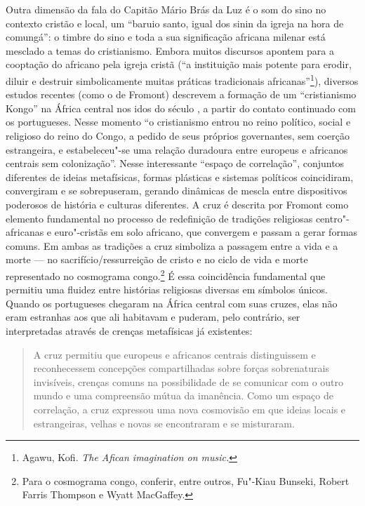 Outra dimensão da fala do Capitão Mário Brás da Luz é o som do sino no
contexto cristão e local, um ``baruio santo, igual dos sinin da igreja
na hora de comungá'': o timbre do sino e toda a sua significação
africana milenar está mesclado a temas do cristianismo. Embora muitos
discursos apontem para a cooptação do africano pela igreja cristã (``a
instituição mais potente para erodir, diluir e destruir simbolicamente
muitas práticas tradicionais africanas''\footnote{Agawu, Kofi. \emph{The
  Afican imagination on music.}}), diversos estudos recentes (como o de
Fromont) descrevem a formação de um ``cristianismo Kongo'' na
África central nos idos do século , a partir do contato continuado com
os portugueses. Nesse momento ``o cristianismo entrou no reino político,
social e religioso do reino do Congo, a pedido de seus próprios
governantes, sem coerção estrangeira, e estabeleceu"-se uma relação
duradoura entre europeus e africanos centrais sem colonização''. Nesse
interessante ``espaço de correlação'', conjuntos diferentes de ideias
metafísicas, formas plásticas e sistemas políticos coincidiram,
convergiram e se sobrepuseram, gerando dinâmicas de mescla entre
dispositivos poderosos de história e culturas diferentes. A cruz é
descrita por Fromont como elemento fundamental no processo de
redefinição de tradições religiosas centro"-africanas e euro"-cristãs em
solo africano, que convergem e passam a gerar formas comuns. Em ambas as
tradições a cruz simboliza a passagem entre a vida e a morte --- no
sacrifício/ressurreição de cristo e no ciclo de vida e morte
representado no cosmograma congo.\footnote{Para o cosmograma congo,
  conferir, entre outros, Fu"-Kiau Bunseki, Robert Farris Thompson e
  Wyatt MacGaffey.} É essa coincidência fundamental que permitiu uma
fluidez entre histórias religiosas diversas em símbolos únicos. Quando
os portugueses chegaram na África central com suas cruzes, elas não eram
estranhas aos que ali habitavam e puderam, pelo contrário, ser
interpretadas através de crenças metafísicas já existentes:

\begin{quote}
A cruz permitiu que europeus e africanos centrais distinguissem e
reconhecessem concepções compartilhadas sobre forças sobrenaturais
invisíveis, crenças comuns na possibilidade de se comunicar com o outro
mundo e uma compreensão mútua da imanência. Como um espaço de
correlação, a cruz expressou uma nova cosmovisão em que ideias locais e
estrangeiras, velhas e novas se encontraram e se misturaram.
\end{quote}

